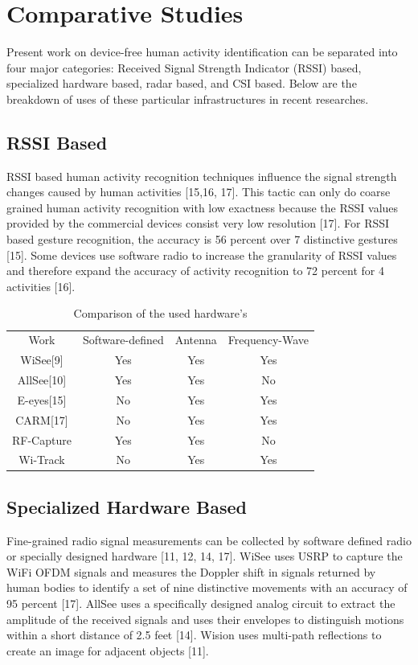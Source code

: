 \documentclass[conference]{IEEEtran}
\begin{document}
\section{Comparative Studies}
Present work on device-free human activity identification can be separated into four major categories: Received Signal Strength Indicator (RSSI) based, specialized hardware based, radar based, and CSI based. Below are the breakdown of uses of these particular infrastructures in recent researches. 
\subsection{RSSI Based}
RSSI based human activity recognition techniques influence the signal strength changes caused by human activities [15,16, 17]. This tactic can only do coarse grained human activity recognition with low exactness because the RSSI values provided by the commercial devices consist very low resolution [17]. For RSSI based gesture recognition, the accuracy is 56 percent over 7 distinctive gestures [15]. Some devices use software radio to increase the granularity of RSSI values and therefore expand the accuracy of activity recognition to 72 percent for 4 activities [16]. 
\begin{table}[h]\caption{\label{tab:statistic}Comparison of the used hardware's}\small\vspace{-0.1in}
\centering 
\begin{tabular}{cccc}
\toprule
Work & Software-defined & Antenna & Frequency-Wave \\
WiSee[9] &  Yes &  Yes &   Yes \\
AllSee[10] & Yes & Yes & No \\
E-eyes[15] & No & Yes & Yes \\
CARM[17] & No & Yes & Yes \\
RF-Capture & Yes & Yes & No \\
Wi-Track & No & Yes & Yes \\
\bottomrule
\end{tabular}
\end{table}
\subsection{ Specialized Hardware Based }
 Fine-grained radio signal measurements can be collected by software defined radio or specially designed hardware [11, 12, 14, 17]. WiSee uses USRP to capture the WiFi OFDM signals and measures the Doppler shift in signals returned by human bodies to identify a set of nine distinctive movements with an accuracy of 95 percent [17]. AllSee uses a specifically designed analog circuit to extract the amplitude of the received signals and uses their envelopes to distinguish motions within a short distance of 2.5 feet [14]. Wision uses multi-path reflections to create an image for adjacent objects [11].
\end{document}
